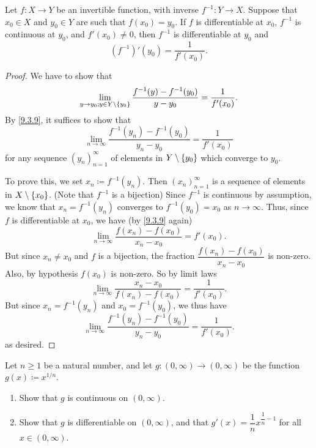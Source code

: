 \begin{thm}\label{10.4.2}
  Let \(f : X \to Y\) be an invertible function, with inverse \(f^{-1} : Y \to X\).
  Suppose that \(x_0 \in X\) and \(y_0 \in Y\) are such that \(f(x_0) = y_0\).
  If \(f\) is differentiable at \(x_0\), \(f^{-1}\) is continuous at \(y_0\), and \(f'(x_0 ) \neq 0\), then \(f^{-1}\) is differentiable at \(y_0\) and
  \[
    (f^{-1})'(y_0) = \dfrac{1}{f'(x_0)}.
  \]
\end{thm}

\begin{proof}
  We have to show that
  \[
    \lim_{y \to y_0 ; y \in Y \setminus \left\lbrace y_0\right\rbrace} \dfrac{f^{-1}(y) - f^{-1}(y_0)}{y - y_0} = \dfrac{1}{f'(x_0)}.
  \]
  By \cref{9.3.9}, it suffices to show that
  \[
    \lim_{n \to \infty} \dfrac{f^{-1}(y_n) - f^{-1}(y_0)}{y_n - y_0} = \dfrac{1}{f'(x_0)}
  \]
  for any sequence \((y_n)_{n = 1}^\infty\) of elements in \(Y \setminus \left\lbrace y_0\right\rbrace\) which converge to \(y_0\).

  To prove this, we set \(x_n \coloneqq f^{-1}(y_n)\).
  Then \((x_n)_{n = 1}^\infty\) is a sequence of elements in \(X \setminus \left\lbrace x_0\right\rbrace\).
  (Note that \(f^{-1}\) is a bijection)
  Since \(f^{-1}\) is continuous by assumption, we know that \(x_n = f^{-1}(y_n)\) converges to \(f^{-1}(y_0) = x_0\) as \(n \to \infty\).
  Thus, since \(f\) is differentiable at \(x_0\), we have (by \cref{9.3.9} again)
  \[
    \lim_{n \to \infty} \dfrac{f(x_n) - f(x_0)}{x_n - x_0} = f'(x_0).
  \]
  But since \(x_n \neq x_0\) and \(f\) is a bijection, the fraction \(\dfrac{f(x_n) - f(x_0)}{x_n - x_0}\) is non-zero.
  Also, by hypothesis \(f(x_0)\) is non-zero.
  So by limit laws
  \[
    \lim_{n \to \infty} \dfrac{x_n - x_0}{f(x_n) - f(x_0)} = \dfrac{1}{f'(x_0)}.
  \]
  But since \(x_n = f^{-1}(y_n)\) and \(x_0 = f^{-1}(y_0)\), we thus have
  \[
    \lim_{n \to \infty} \dfrac{f^{-1}(y_n) - f^{-1}(y_0)}{y_n - y_0} = \dfrac{1}{f'(x_0)}.
  \]
  as desired.
\end{proof}

\exercisesection

\begin{ex}\label{ex:10.4.1}
  Let \(n \geq 1\) be a natural number, and let \(g : (0, \infty) \to (0, \infty)\) be the function \(g(x) \coloneqq x^{1 / n}\).
  \begin{enumerate}
    \item Show that \(g\) is continuous on \((0, \infty)\).
    \item Show that \(g\) is differentiable on \((0, \infty)\), and that \(g'(x) = \dfrac{1}{n} x^{\dfrac{1}{n} - 1}\) for all \(x \in (0, \infty)\).
  \end{enumerate}
\end{ex}

